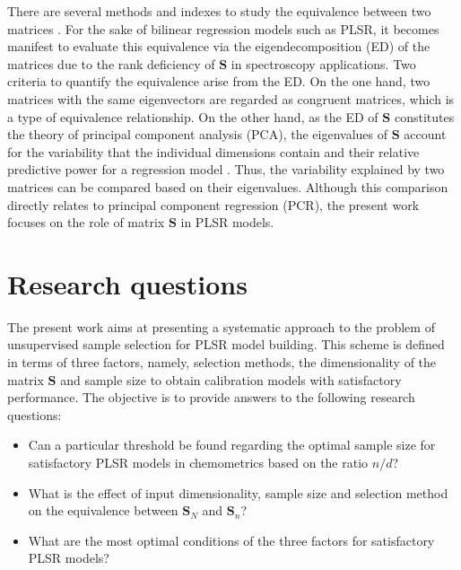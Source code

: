 \documentclass[journal=ancham,manuscript=article]{achemso}
\begin{document}
There are several methods and indexes to study the equivalence between two matrices \cite{Tomic2013}. For the sake of bilinear regression models such as PLSR, it becomes manifest to evaluate this equivalence via the eigendecomposition (ED) of the matrices due to the rank deficiency of $\mathbf{S}$ in spectroscopy applications. Two criteria to quantify the equivalence arise from the ED. On the one hand, two matrices with the same eigenvectors are regarded as congruent matrices, which is a type of equivalence relationship\cite{Horn1985}. On the other hand, as the ED of $\mathbf{S}$ constitutes the theory of principal component analysis (PCA), the eigenvalues of $\mathbf{S}$ account for the variability that the individual dimensions contain and their relative predictive power for a regression model \cite{Artemiou2013}. Thus, the variability explained by two matrices can be compared based on their eigenvalues. Although this comparison directly relates to principal component regression (PCR), the present work focuses on the role of matrix $\mathbf{S}$ in PLSR models.


\section{Research questions}

The present work aims at presenting a systematic approach to the problem of unsupervised sample selection for PLSR model building. This scheme is defined in terms of three factors, namely, selection methods, the dimensionality of the matrix $\mathbf{S}$ and sample size to obtain calibration models with satisfactory performance. The objective is to provide answers to the following research questions:

\begin{itemize}

    \item Can a particular threshold be found regarding the optimal sample size for satisfactory PLSR models in chemometrics based on the ratio $n/d$?

    \item What is the effect of input dimensionality, sample size and selection method on the equivalence between $\mathbf{S}_N$ and $\mathbf{S}_n$?
    
    \item What are the most optimal conditions of the three factors for satisfactory PLSR models?

\end{itemize}
\end{document}
